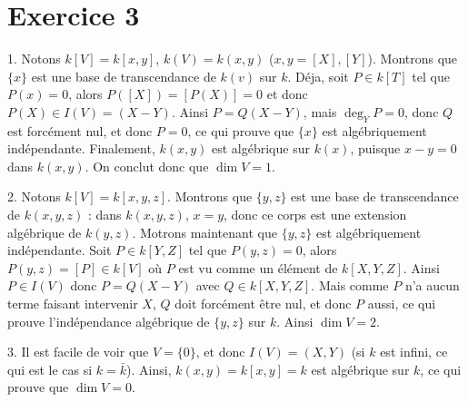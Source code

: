     \section{Exercice 3}
        \begin{question}{1.}
            Notons $k[V] = k[x,y]$, $k(V) = k(x,y)$ ($x,y = [X],[Y]$). Montrons que $\{x\}$ est une base de transcendance de $k(v)$ sur $k$. Déja, soit $P \in k[T]$ tel que $P(x) = 0$, alors $P([X]) = [P(X)] = 0$ et donc $P(X) \in I(V) = (X - Y)$. Ainsi $P = Q(X - Y)$, mais $\deg_Y P = 0$, donc $Q$ est forcément nul, et donc $P = 0$, ce qui prouve que $\{x\}$ est algébriquement indépendante. Finalement, $k(x,y)$ est algébrique sur $k(x)$, puisque $x - y = 0$ dans $k(x,y)$. On conclut donc que $\dim V = 1$.
        \end{question}
        \begin{question}{2.}
            Notons $k[V] = k[x,y,z]$. Montrons que $\{y,z\}$ est une base de transcendance de $k(x,y,z)$ : dans $k(x,y,z)$, $x = y$, donc ce corps est une extension algébrique de $k(y,z)$. Motrons maintenant que $\{y,z\}$ est algébriquement indépendante. Soit $P \in k[Y,Z]$ tel que $P(y,z) = 0$, alors $P(y,z) = [P] \in k[V]$ où $P$ est vu comme un élément de $k[X,Y,Z]$. Ainsi $P \in I(V)$ donc $P = Q(X - Y)$ avec $Q \in k[X,Y,Z]$. Mais comme $P$ n'a aucun terme faisant intervenir $X$, $Q$ doit forcément être nul, et donc $P$ aussi, ce qui prouve l'indépendance algébrique de $\{y,z\}$ sur $k$. Ainsi $\dim V = 2$.
        \end{question}
        \begin{question}{3.}
            Il est facile de voir que $V = \{0\}$, et donc $I(V) = (X,Y)$ (si $k$ est infini, ce qui est le cas si $k = \bar k$). Ainsi, $k(x,y) = k[x,y] = k$ est algébrique sur $k$, ce qui prouve que $\dim V = 0$.
        \end{question}
